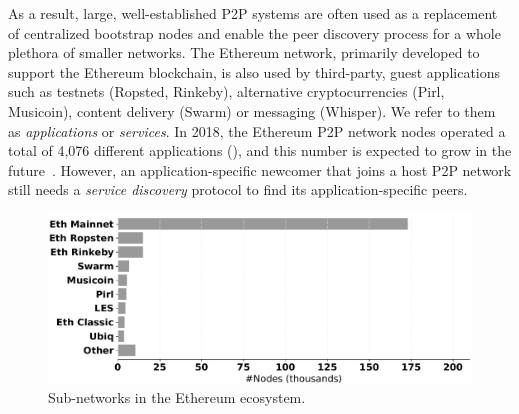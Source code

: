 As a result, large, well-established P2P systems are often used as a replacement of centralized bootstrap nodes and enable the peer discovery process for a whole plethora of smaller networks. The Ethereum network, primarily developed to support the Ethereum blockchain, is also used by third-party, guest applications such as testnets (Ropsted, Rinkeby), alternative cryptocurrencies (Pirl, Musicoin), content delivery (Swarm) or messaging (Whisper). We refer to them as \emph{applications} or \emph{services}. In 2018, the Ethereum P2P network nodes operated a total of 4,076 different applications (), and this number is expected to grow in the future~\cite{kim2018measuring}. However, an application-specific newcomer that joins a host P2P network still needs a \emph{service discovery} protocol to find its application-specific peers. 

\begin{figure}
    \includegraphics[width=1\linewidth]{img/ecosystem}
    \caption{Sub-networks in the Ethereum ecosystem.}
    \label{fig:ecosystem}
\end{figure}




